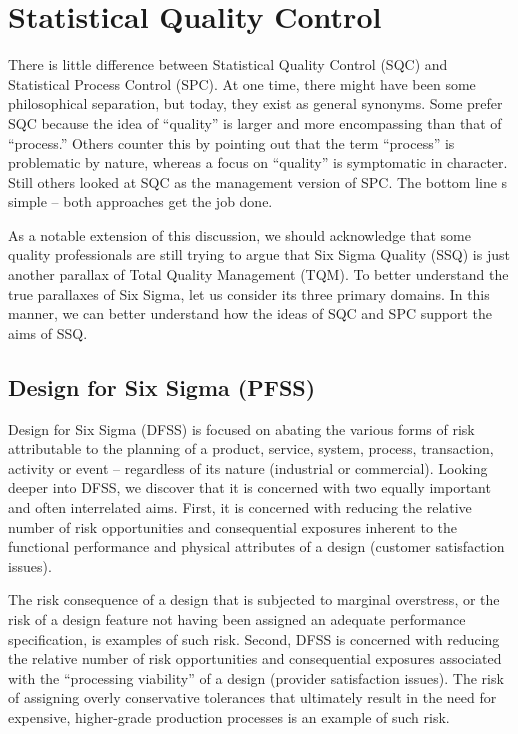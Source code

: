 \documentclass[11pt]{article} %
\begin{document}
\tableofcontents
\section{Statistical Quality Control}
There is little difference between Statistical Quality Control (SQC) and Statistical Process Control (SPC).  At one time, there might have been some philosophical separation, but today, they exist as general synonyms.  Some prefer SQC because the idea of “quality” is larger and more encompassing than that of “process.”  Others counter this by pointing out that the term “process” is problematic by nature, whereas a focus on “quality” is symptomatic in character.  Still others looked at SQC as the management version of SPC.  The bottom line s simple – both approaches get the job done.

As a notable extension of this discussion, we should acknowledge that some quality professionals are still trying to argue that Six Sigma Quality (SSQ) is just another parallax of Total Quality Management (TQM).  To better understand the true parallaxes of Six Sigma, let us consider its three primary domains.  In this manner, we can better understand how the ideas of SQC and SPC support the aims of SSQ.

\subsection{Design for Six Sigma (PFSS)}
Design for Six Sigma (DFSS) is focused on abating the various forms of risk attributable to the planning of a product, service, system, process, transaction, activity or event – regardless of its nature (industrial or commercial). Looking deeper into DFSS, we discover that it is concerned with two equally important and often interrelated aims.  First, it is concerned with reducing the relative number of risk opportunities and consequential exposures inherent to the functional performance and physical attributes of a design (customer satisfaction issues).  


The risk consequence of a design that is subjected to marginal overstress, or the risk of a design feature not having been assigned an adequate performance specification, is examples of such risk.  Second, DFSS is concerned with reducing the relative number of risk opportunities and consequential exposures associated with the “processing viability” of a design (provider satisfaction issues).  The risk of assigning overly conservative tolerances that ultimately result in the need for expensive, higher-grade production processes is an example of such risk.
\end{document}
